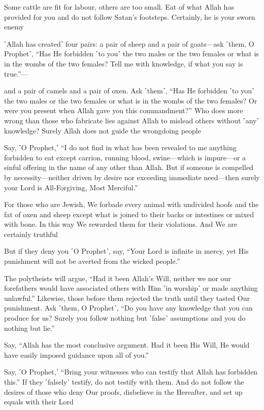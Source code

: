 Some cattle are fit for labour, others are too small. Eat of what Allah has provided for you and do not follow Satan’s footsteps. Certainly, he is your sworn enemy

˹Allah has created˺ four pairs: a pair of sheep and a pair of goats—ask ˹them, O Prophet˺, “Has He forbidden ˹to you˺ the two males or the two females or what is in the wombs of the two females? Tell me with knowledge, if what you say is true.”—

and a pair of camels and a pair of oxen. Ask ˹them˺, “Has He forbidden ˹to you˺ the two males or the two females or what is in the wombs of the two females? Or were you present when Allah gave you this commandment?” Who does more wrong than those who fabricate lies against Allah to mislead others without ˹any˺ knowledge? Surely Allah does not guide the wrongdoing people

Say, ˹O Prophet,˺ “I do not find in what has been revealed to me anything forbidden to eat except carrion, running blood, swine—which is impure—or a sinful offering in the name of any other than Allah. But if someone is compelled by necessity—neither driven by desire nor exceeding immediate need—then surely your Lord is All-Forgiving, Most Merciful.”

For those who are Jewish, We forbade every animal with undivided hoofs and the fat of oxen and sheep except what is joined to their backs or intestines or mixed with bone. In this way We rewarded them for their violations. And We are certainly truthful

But if they deny you ˹O Prophet˺, say, “Your Lord is infinite in mercy, yet His punishment will not be averted from the wicked people.”

The polytheists will argue, “Had it been Allah’s Will, neither we nor our forefathers would have associated others with Him ˹in worship˺ or made anything unlawful.” Likewise, those before them rejected the truth until they tasted Our punishment. Ask ˹them, O Prophet˺, “Do you have any knowledge that you can produce for us? Surely you follow nothing but ˹false˺ assumptions and you do nothing but lie.”

Say, “Allah has the most conclusive argument. Had it been His Will, He would have easily imposed guidance upon all of you.”

Say, ˹O Prophet,˺ “Bring your witnesses who can testify that Allah has forbidden this.” If they ˹falsely˺ testify, do not testify with them. And do not follow the desires of those who deny Our proofs, disbelieve in the Hereafter, and set up equals with their Lord

